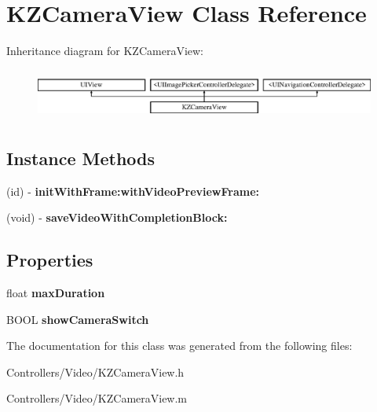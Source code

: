 \hypertarget{interface_k_z_camera_view}{}\section{K\+Z\+Camera\+View Class Reference}
\label{interface_k_z_camera_view}
Inheritance diagram for K\+Z\+Camera\+View\+:\begin{figure}[H]
\begin{center}
\leavevmode
\includegraphics[height=1.696970cm]{interface_k_z_camera_view}
\end{center}
\end{figure}
\subsection*{Instance Methods}
\begin{DoxyCompactItemize}
\item 
\hypertarget{interface_k_z_camera_view_ae343437aee3984e30083c566ff760353}{}(id) -\/ {\bfseries init\+With\+Frame\+:with\+Video\+Preview\+Frame\+:}\label{interface_k_z_camera_view_ae343437aee3984e30083c566ff760353}

\item 
\hypertarget{interface_k_z_camera_view_af1514ab155764bb51d94ada94a8baed9}{}(void) -\/ {\bfseries save\+Video\+With\+Completion\+Block\+:}\label{interface_k_z_camera_view_af1514ab155764bb51d94ada94a8baed9}

\end{DoxyCompactItemize}
\subsection*{Properties}
\begin{DoxyCompactItemize}
\item 
\hypertarget{interface_k_z_camera_view_a05251581f360aa1c993e6808d988544e}{}float {\bfseries max\+Duration}\label{interface_k_z_camera_view_a05251581f360aa1c993e6808d988544e}

\item 
\hypertarget{interface_k_z_camera_view_ad81ea697baba6b8d3f2440b05f95724d}{}B\+O\+O\+L {\bfseries show\+Camera\+Switch}\label{interface_k_z_camera_view_ad81ea697baba6b8d3f2440b05f95724d}

\end{DoxyCompactItemize}


The documentation for this class was generated from the following files\+:\begin{DoxyCompactItemize}
\item 
Controllers/\+Video/K\+Z\+Camera\+View.\+h\item 
Controllers/\+Video/K\+Z\+Camera\+View.\+m\end{DoxyCompactItemize}
